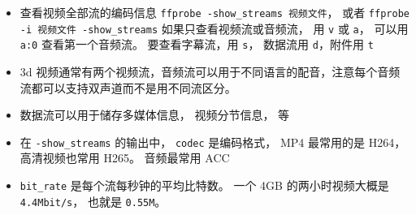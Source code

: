 
\begin{issues}
\issueDraft
\end{issues}

\begin{itemize}
\item 查看视频全部流的编码信息 \verb|ffprobe -show_streams 视频文件|， 或者 \verb|ffprobe -i 视频文件 -show_streams| 如果只查看视频流或音频流， 用 \verb|v| 或 \verb|a|， 可以用 \verb|a:0| 查看第一个音频流。 要查看字幕流，用 \verb|s|， 数据流用 \verb|d|，附件用 \verb|t|
\item 3d 视频通常有两个视频流，音频流可以用于不同语言的配音，注意每个音频流都可以支持双声道而不是用不同流区分。
\item 数据流可以用于储存多媒体信息， 视频分节信息， 等
\item 在 \verb|-show_streams| 的输出中， \verb|codec| 是编码格式， MP4 最常用的是 H264， 高清视频也常用 H265。 音频最常用 ACC
\item \verb|bit_rate| 是每个流每秒钟的平均比特数。 一个 4GB 的两小时视频大概是 \verb|4.4Mbit/s|， 也就是 \verb|0.55M|。
\end{itemize}
